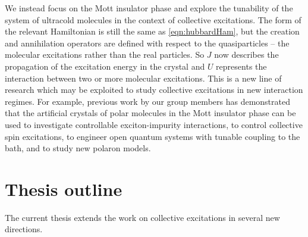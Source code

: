 We instead focus on the Mott insulator phase and explore the tunability of the system of ultracold molecules in the 
context of collective excitations. The form of the relevant Hamiltonian is still the same as \autoref{eqn:hubbardHam}, but the creation
and annihilation operators are defined with respect to the quasiparticles -- the molecular excitations rather than the real 
particles.  So $J$ now describes the propagation of the excitation energy in the crystal and $U$ represents the interaction
between two or more molecular excitations. This is a new line of research which may be exploited to study collective 
excitations in new interaction regimes. For example, previous work by our group members has demonstrated
that the artificial crystals of polar molecules in the Mott insulator phase can be used to investigate controllable exciton-impurity interactions\cite{felipe},
to control collective spin excitations\cite{perez-rios2010}, to engineer open quantum systems with tunable coupling to the bath\cite{felipe-polarons}, and to study new polaron models\cite{felipe-arxive-polaron}. 


\section{Thesis outline}
\label{sec:outline}

The current thesis extends the work on collective excitations in several new directions. 


